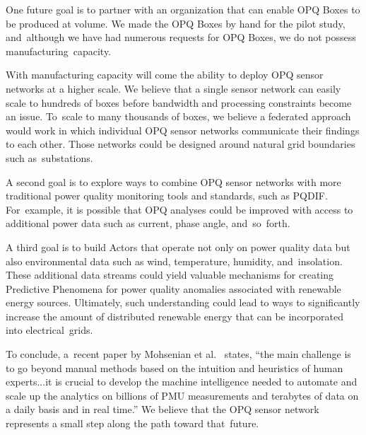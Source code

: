 \documentclass[energies,article,accept,moreauthors,pdftex]{Definitions/mdpi}
\begin{document}
One future goal is to partner with an organization that can enable OPQ Boxes to be produced at volume. We made the OPQ Boxes by hand for the pilot study, and~although we have had numerous requests for OPQ Boxes, we do not possess manufacturing~capacity.

With manufacturing capacity will come the ability to deploy OPQ sensor networks at a higher scale. We believe that a single sensor network can easily scale to hundreds of boxes before bandwidth and processing constraints become an issue. To~scale to many thousands of boxes, we believe a federated approach would work in which individual OPQ sensor networks communicate their findings to each other. Those networks could be designed around natural grid boundaries such as~substations.

A second goal is to explore ways to combine OPQ sensor networks with more traditional power quality monitoring tools and standards, such as PQDIF. For~example, it is possible that OPQ analyses could be improved with access to additional power data such as current, phase angle, and~so~forth.

A third goal is to build Actors that operate not only on power quality data but also environmental data such as wind, temperature, humidity, and~insolation. These additional data streams could yield valuable mechanisms for creating Predictive Phenomena for power quality anomalies associated with renewable energy sources. Ultimately, such understanding could lead to ways to significantly increase the amount of distributed renewable energy that can be incorporated into electrical~grids.

To conclude, a~recent paper by Mohsenian et al.~\cite{mohsenian-rad_distribution_2018} states, “the main challenge is to go beyond manual methods based on the intuition and heuristics of human experts...it is crucial to develop the machine intelligence needed to automate and scale up the analytics on billions of PMU measurements and terabytes of data on a daily basis and in real time.” We believe that the OPQ sensor network represents a small step along the path toward that~future.




\end{document}
